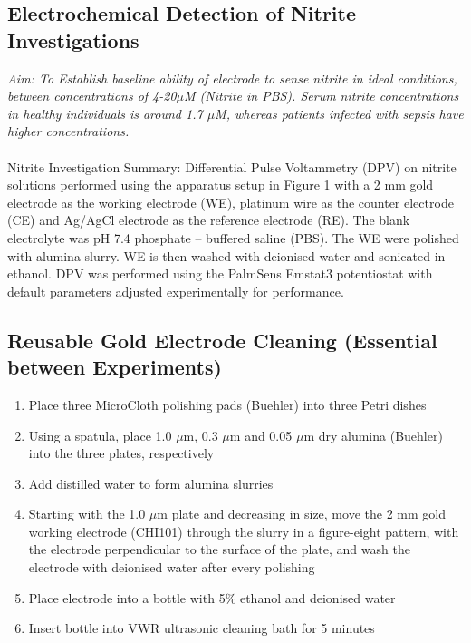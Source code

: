 \begin{appendices}
\subsection{Electrochemical Detection of Nitrite Investigations} 
\textit{Aim: To Establish baseline ability of electrode to sense nitrite in ideal conditions, between concentrations of 4-20$\mu$M (Nitrite in PBS). Serum nitrite concentrations in healthy individuals is around 1.7 $\mu$M, whereas patients infected with sepsis have higher concentrations.} \\\\
Nitrite Investigation Summary:
Differential Pulse Voltammetry (DPV) on nitrite solutions performed using the apparatus setup in Figure 1 with a 2 mm gold electrode as the working electrode (WE), platinum wire  as the counter electrode (CE) and Ag/AgCl electrode as the reference electrode (RE). The blank electrolyte was pH 7.4 phosphate – buffered saline (PBS). The WE were polished with alumina slurry. WE is then washed with deionised water and sonicated in ethanol. DPV was performed using the PalmSens Emstat3 potentiostat with default parameters adjusted experimentally for performance.
\subsection{Reusable Gold Electrode Cleaning (Essential between Experiments)}
\begin{enumerate}
    \item Place three MicroCloth polishing pads (Buehler) into three Petri dishes
    \item Using a spatula,  place 1.0 $\mu$m, 0.3 $\mu$m and 0.05 $\mu$m dry alumina (Buehler) into the three plates, respectively
    \item Add distilled water to form alumina slurries
    \item Starting with the 1.0 $\mu$m plate and decreasing in size, move the 2 mm gold working electrode (CHI101) through the slurry in a figure-eight pattern, with the electrode perpendicular to the surface of the plate, and wash the electrode with deionised water after every polishing
    \item Place electrode into a bottle with 5\% ethanol and deionised water
    \item Insert bottle into VWR ultrasonic cleaning bath for 5 minutes
\end{enumerate}


\end{appendices}
